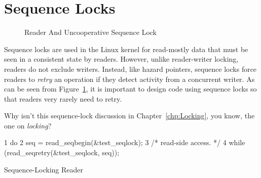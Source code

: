 
\section{Sequence Locks}
\label{sec:defer:Sequence Locks}

\begin{figure}[tb]
\centering
{}
\caption{Reader And Uncooperative Sequence Lock}
\label{fig:defer:Reader And Uncooperative Sequence Lock}
\end{figure}

Sequence locks are used in the Linux kernel for read-mostly data that
must be seen in a consistent state by readers.
However, unlike reader-writer locking, readers do not exclude writers.
Instead, like hazard pointers, sequence locks force readers to
\emph{retry} an operation if they detect activity from a concurrent writer.
As can be seen from
Figure~\ref{fig:defer:Reader And Uncooperative Sequence Lock},
it is important to design code using sequence locks so that readers
very rarely need to retry.

\QuickQuiz{}
	Why isn't this sequence-lock discussion in Chapter~\ref{chp:Locking},
	you know, the one on \emph{locking}?
 \QuickQuizEnd

\begin{listing}[bp]
{ \scriptsize
\begin{verbbox}
  1 do {
  2   seq = read_seqbegin(&test_seqlock);
  3   /* read-side access. */
  4 } while (read_seqretry(&test_seqlock, seq));
\end{verbbox}
}
\centering
\theverbbox
\caption{Sequence-Locking Reader}
\label{lst:defer:Sequence-Locking Reader}
\end{listing}


